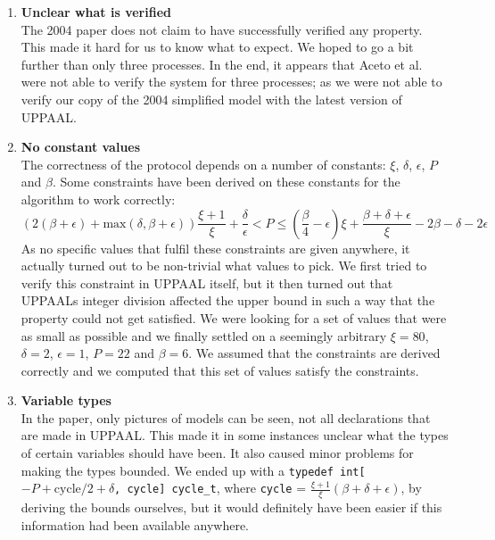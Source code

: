 \documentclass[a4paper,10pt]{article}
\newcommand{\UPPAAL}{UPPAAL\xspace}
\newcommand{\oldsimple}{2004 simplified model\xspace}
\begin{document}
\begin{enumerate}
\item \textbf{Unclear what is verified} \\
	The 2004 paper does not claim to have successfully verified any property. This made it hard for us to know what to expect. We hoped to go a bit further than only three processes. In the end, it appears that Aceto et al. \cite{Aceto2004Notes} were not able to verify the system for three processes; as we were not able to verify our copy of the \oldsimple with the latest version of \UPPAAL.

\item \textbf{No constant values} \\
	The correctness of the protocol depends on a number of constants: \(\xi\), \(\delta\), \(\epsilon\), \(P\) and \(\beta\). Some constraints have been derived on these constants for the algorithm to work correctly:
	\[ (2(\beta+\epsilon)+\textrm{max}(\delta,\beta+\epsilon))\frac{\xi+1}{\xi} + \frac{\delta}{\epsilon} < P \le (\frac{\beta}{4}-\epsilon)\xi + \frac{\beta+\delta+\epsilon}{\xi}-2\beta-\delta-2\epsilon \]
	As no specific values that fulfil these constraints are given anywhere, it actually turned out to be non-trivial what values to pick. We first tried to verify this constraint in \UPPAAL itself, but it then turned out that \UPPAAL{}s integer division affected the upper bound in such a way that the property could not get satisfied. We were looking for a set of values that were as small as possible and we finally settled on a seemingly arbitrary \(\xi=80\), \(\delta=2\), \(\epsilon=1\), \(P=22\) and \(\beta=6\). We assumed that the constraints are derived correctly and we computed that this set of values satisfy the constraints.

\item \textbf{Variable types} \\
	In the paper, only pictures of models can be seen, not all declarations that are made in \UPPAAL. This made it in some instances unclear what the types of certain variables should have been. It also caused minor problems for making the types bounded. We ended up with a \texttt{typedef int[\(-P+\text{cycle}/2+\delta\), cycle] cycle\_t}, where \texttt{cycle} = \(\frac{\xi+1}{\xi}(\beta+\delta+\epsilon)\), by deriving the bounds ourselves, but it would definitely have been easier if this information had been available anywhere.
\end{enumerate}

\end{document}
